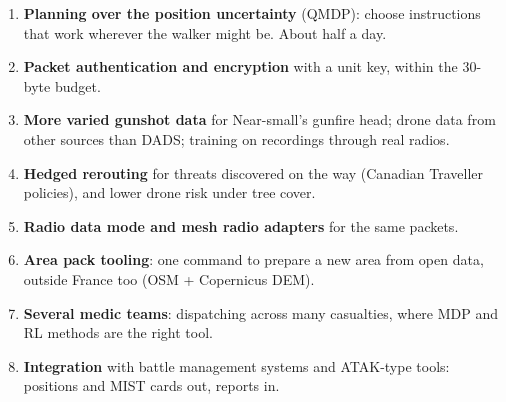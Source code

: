 \begin{enumerate}
  \item \textbf{Planning over the position uncertainty} (QMDP): choose instructions that work wherever the walker might be. About half a day.
  \item \textbf{Packet authentication and encryption} with a unit key, within the 30-byte budget.
  \item \textbf{More varied gunshot data} for Near-small's gunfire head; drone data from other sources than DADS; training on recordings
        through real radios.
  \item \textbf{Hedged rerouting} for threats discovered on the way (Canadian Traveller policies), and lower drone risk under tree cover.
  \item \textbf{Radio data mode and mesh radio adapters} for the same packets.
  \item \textbf{Area pack tooling}: one command to prepare a new area from open data, outside France too (OSM + Copernicus DEM).
  \item \textbf{Several medic teams}: dispatching across many casualties, where MDP and RL methods are the right tool.
  \item \textbf{Integration} with battle management systems and ATAK-type tools: positions and MIST cards out, reports in.
\end{enumerate}
